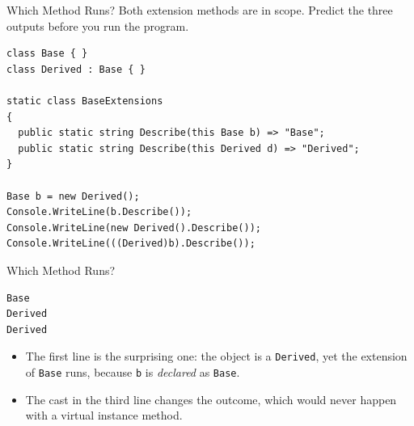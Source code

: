 \begin{exerciseframe}{Which Method Runs?}
  Both extension methods are in scope. Predict the three outputs before you run
  the program.
  \vspace{1ex}

  \begin{lstlisting}[basicstyle=\scriptsize\ttfamily]
class Base { }
class Derived : Base { }

static class BaseExtensions
{
  public static string Describe(this Base b) => "Base";
  public static string Describe(this Derived d) => "Derived";
}

Base b = new Derived();
Console.WriteLine(b.Describe());
Console.WriteLine(new Derived().Describe());
Console.WriteLine(((Derived)b).Describe());
  \end{lstlisting}
\end{exerciseframe}

\begin{solutionframe}{Which Method Runs?}
  \begin{lstlisting}[language={},basicstyle=\scriptsize\ttfamily]
Base
Derived
Derived
  \end{lstlisting}
  \begin{itemize}
    \item The first line is the surprising one: the object is a
      \texttt{Derived}, yet the extension of \texttt{Base} runs, because
      \texttt{b} is \emph{declared} as \texttt{Base}.
    \item The cast in the third line changes the outcome, which would never
      happen with a virtual instance method.
  \end{itemize}
  \vspace{4ex}

\end{solutionframe}

